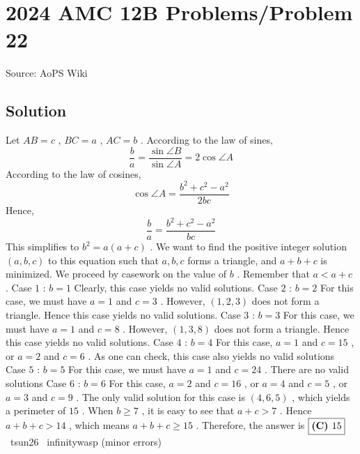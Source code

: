 \documentclass[12pt]{article}
\begin{document}
\section*{{2024 AMC 12B Problems/Problem 22}}
Source: AoPS Wiki

\subsection*{Solution}
Let $AB=c$ , $BC=a$ , $AC=b$ . According to the law of sines, \[\frac{b}{a}=\frac{\sin \angle B}{\sin \angle A}=2\cos \angle A\] According to the law of cosines, \[\cos \angle A=\frac{b^2+c^2-a^2}{2bc}\] Hence, \[\frac{b}{a}=\frac{b^2+c^2-a^2}{bc}\] This simplifies to $b^2=a(a+c)$ . We want to find the positive integer solution $(a, b, c)$ to this equation such that $a, b, c$ forms a triangle, and $a+b+c$ is minimized. We proceed by casework on the value of $b$ . Remember that $a<a+c$ . Case $1$ : $b=1$ Clearly, this case yields no valid solutions. Case $2$ : $b=2$ For this case, we must have $a=1$ and $c=3$ . However, $(1, 2, 3)$ does not form a triangle. Hence this case yields no valid solutions. Case $3$ : $b=3$ For this case, we must have $a=1$ and $c=8$ . However, $(1, 3, 8)$ does not form a triangle. Hence this case yields no valid solutions. Case $4$ : $b=4$ For this case, $a=1$ and $c=15$ , or $a=2$ and $c=6$ . As one can check, this case also yields no valid solutions Case $5$ : $b=5$ For this case, we must have $a=1$ and $c=24$ . There are no valid solutions Case $6$ : $b=6$ For this case, $a=2$ and $c=16$ , or $a=4$ and $c=5$ , or $a=3$ and $c=9$ . The only valid solution for this case is $(4, 6, 5)$ , which yields a perimeter of $15$ . When $b\ge 7$ , it is easy to see that $a+c>7$ . Hence $a+b+c>14$ , which means $a+b+c\ge15$ . Therefore, the answer is $\fbox{\textbf{(C) }15}$ ~tsun26
~infinitywasp (minor errors)
\end{document}
